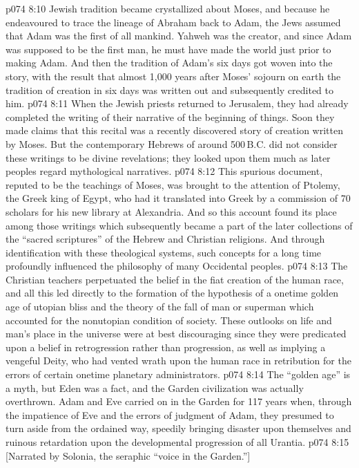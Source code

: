 \vs p074 8:10 Jewish tradition became crystallized about Moses, and because he endeavoured to trace the lineage of Abraham back to Adam, the Jews assumed that Adam was the first of all mankind. Yahweh was the creator, and since Adam was supposed to be the first man, he must have made the world just prior to making Adam. And then the tradition of Adam’s six days got woven into the story, with the result that almost 1,000 years after Moses’ sojourn on earth the tradition of creation in six days was written out and subsequently credited to him.
\vs p074 8:11 When the Jewish priests returned to Jerusalem, they had already completed the writing of their narrative of the beginning of things. Soon they made claims that this recital was a recently discovered story of creation written by Moses. But the contemporary Hebrews of around 500\,B.C. did not consider these writings to be divine revelations; they looked upon them much as later peoples regard mythological narratives.
\vs p074 8:12 This spurious document, reputed to be the teachings of Moses, was brought to the attention of Ptolemy, the Greek king of Egypt, who had it translated into Greek by a commission of 70 scholars for his new library at Alexandria. And so this account found its place among those writings which subsequently became a part of the later collections of the “sacred scriptures” of the Hebrew and Christian religions. And through identification with these theological systems, such concepts for a long time profoundly influenced the philosophy of many Occidental peoples.
\vs p074 8:13 The Christian teachers perpetuated the belief in the fiat creation of the human race, and all this led directly to the formation of the hypothesis of a onetime golden age of utopian bliss and the theory of the fall of man or superman which accounted for the nonutopian condition of society. These outlooks on life and man’s place in the universe were at best discouraging since they were predicated upon a belief in retrogression rather than progression, as well as implying a vengeful Deity, who had vented wrath upon the human race in retribution for the errors of certain onetime planetary administrators.
\vs p074 8:14 \pc The “golden age” is a myth, but Eden was a fact, and the Garden civilization was actually overthrown. Adam and Eve carried on in the Garden for 117 years when, through the impatience of Eve and the errors of judgment of Adam, they presumed to turn aside from the ordained way, speedily bringing disaster upon themselves and ruinous retardation upon the developmental progression of all Urantia.
\vsetoff
\vs p074 8:15 [Narrated by Solonia, the seraphic “voice in the Garden.”]
\quizlink
